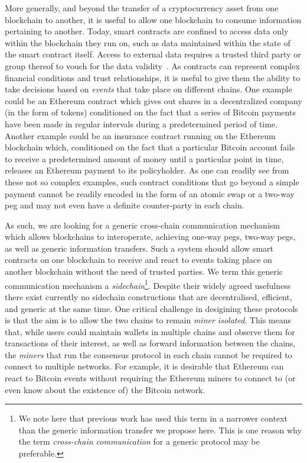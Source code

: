 More generally, and beyond the transfer of a cryptocurrency asset from one
blockchain to another, it is useful to allow one blockchain to consume
information pertaining to another. Today, smart contracts are confined to access
data only within the blockchain they run on, such as data maintained within the
state of the smart contract itself. Access to external data requires a trusted
third party or group thereof to vouch for the data validity~\cite{towncrier}.
As contracts can represent complex financial conditions and trust relationships,
it is useful to give them the ability to take decisions based on \emph{events}
that take place on different chains. One example could be an Ethereum contract
which gives out shares in a decentralized company (in the form of tokens)
conditioned on the fact that a series of Bitcoin payments have been made in
regular intervals during a predetermined period of time. Another example could
be an insurance contract running on the Ethereum blockchain which, conditioned
on the fact that a particular Bitcoin account fails to receive a predetermined
amount of money until a particular point in time, releases an Ethereum payment
to its policyholder. As one can readily see from these not so complex examples,
such contract conditions that go beyond a simple payment cannot be readily
encoded in the form of an atomic swap or a two-way peg and may not even have a
definite counter-party in each chain.

As such, we are looking for a generic cross-chain communication mechanism which
allows blockchains to interoperate, achieving one-way pegs, two-way pegs, as
well as generic information transfers. Such a system should allow smart
contracts on one blockchain to receive and react to events taking place on
another blockchain without the need of trusted parties. We term this generic
communication mechanism a \emph{sidechain}\footnote{We note here that previous
work has used this term in a narrower context than the generic information
transfer we propose here. This is one reason why the term \emph{cross-chain
communication} for a generic protocol may be preferable.}. Despite their widely
agreed usefulness there exist currently no sidechain constructions that are
decentralised, efficient, and generic at the same time. One critical challenge
in desigining these protocols is that the aim is to allow the two chains to
remain \emph{miner isolated}. This means that, while users could maintain
wallets in multiple chains and observe them for transactions of their interest,
as well as forward information between the chains, the \emph{miners} that
run the consensus protocol in each chain cannot be required to connect to
multiple networks. For example, it is desirable that Ethereum can react to
Bitcoin events without requiring the Ethereum miners to connect to (or even know
about the existence of) the Bitcoin network.

